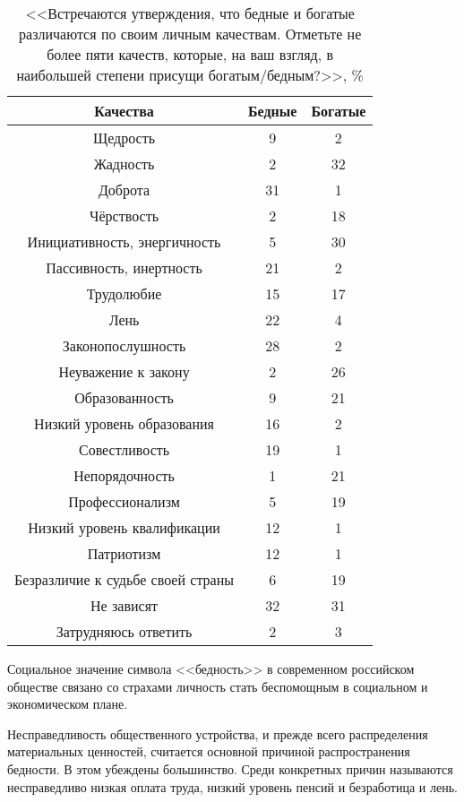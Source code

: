 \begin{table}[H]
    \centering
    \begin{tabular}{|c|c|c|}
        \hline
        Качества & Бедные & Богатые \\ \hline \hline
        Щедрость & 9 & 2 \\ \hline
        Жадность & 2 & 32 \\ \hline
        Доброта & 31 & 1 \\ \hline
        Чёрствость & 2 & 18 \\ \hline
        Инициативность, энергичность & 5 & 30 \\ \hline
        Пассивность, инертность & 21 & 2 \\ \hline
        Трудолюбие & 15 & 17 \\ \hline
        Лень & 22 & 4 \\ \hline
        Законопослушность & 28 & 2 \\ \hline
        Неуважение к закону & 2 & 26 \\ \hline
        Образованность & 9 & 21 \\ \hline
        Низкий уровень образования & 16 & 2 \\ \hline
        Совестливость & 19 & 1 \\ \hline
        Непорядочность & 1 & 21 \\ \hline
        Профессионализм & 5 & 19 \\ \hline
        Низкий уровень квалификации & 12 & 1 \\ \hline
        Патриотизм & 12 & 1 \\ \hline
        Безразличие к судьбе своей страны & 6 & 19 \\ \hline
        Не зависят & 32 & 31 \\ \hline
        Затрудняюсь ответить & 2 & 3 \\ \hline
    \end{tabular}
    \caption{<<Встречаются утверждения, что бедные и богатые различаются по 
        своим личным качествам. Отметьте не более пяти качеств, которые, 
        на ваш взгляд, в наибольшей степени присущи богатым/бедным?>>, \%}
\end{table}

Социальное значение символа <<бедность>> в современном российском обществе 
связано со страхами личность стать беспомощным в социальном и экономическом 
плане. 

Несправедливость общественного устройства, и прежде всего распределения 
материальных ценностей, считается основной причиной распространения бедности. 
В этом убеждены большинство. Среди конкретных причин называются несправедливо 
низкая оплата труда, низкий уровень пенсий и безработица и лень.

